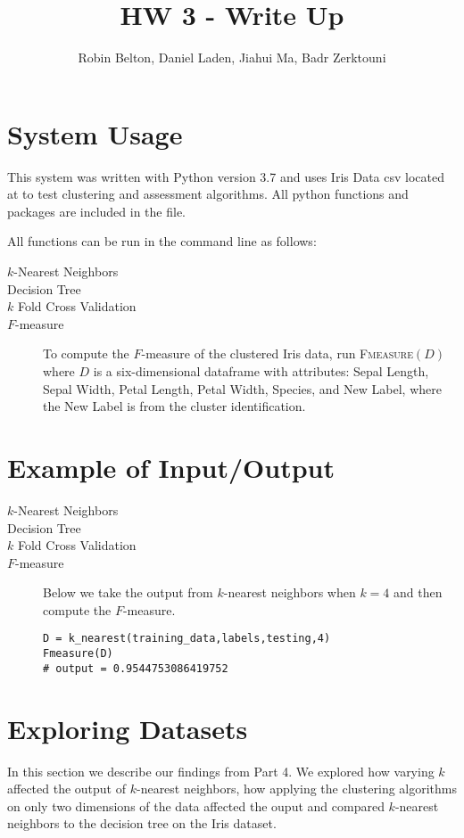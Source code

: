 \documentclass[psamsfonts,onesided,10pt]{amsart}
\title{HW 3 - Write Up}
\author{Robin Belton, Daniel Laden, Jiahui Ma,  Badr Zerktouni}
\begin{document}
\maketitle

\section{System Usage}

This system was written with Python version 3.7 and uses Iris Data csv located at  
to test clustering and assessment algorithms. All python functions and packages are included in the  file.

All functions can be run in the command line as follows:

\begin{description}
\item[$k$-Nearest Neighbors] 
\item[Decision Tree] 
\item[$k$ Fold Cross Validation] 
\item[$F$-measure] To compute the $F$-measure of the clustered Iris data, run \textsc{Fmeasure}$(D)$ 
where $D$ is a six-dimensional dataframe with attributes: Sepal Length, Sepal Width, Petal Length, Petal Width,
              Species, and New Label, where the New Label is from the cluster identification. 
\end{description}
 
\section{Example of Input/Output}
\begin{description}
\item[$k$-Nearest Neighbors] \todo{}

\item[Decision Tree] \todo{}

\item[$k$ Fold Cross Validation] \todo{}

\item[$F$-measure] Below we take the output from $k$-nearest neighbors when $k=4$ and then compute the $F$-measure. 
\begin{verbatim}
D = k_nearest(training_data,labels,testing,4)
Fmeasure(D)
# output = 0.9544753086419752
\end{verbatim}
\end{description}

\section{Exploring Datasets}
In this section we describe our findings from Part 4. We explored how varying $k$ affected the output of $k$-nearest neighbors, how applying the clustering algorithms on only two dimensions of the data affected the ouput and compared $k$-nearest neighbors to the decision tree on the Iris dataset. 

\end{document}
